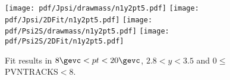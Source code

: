 \begin{figure}[H]
\begin{center}
\texttt{[image: pdf/Jpsi/drawmass/n1y2pt5.pdf]}
\texttt{[image: pdf/Jpsi/2DFit/n1y2pt5.pdf]}
\vspace*{-0.5cm}
\texttt{[image: pdf/Psi2S/drawmass/n1y2pt5.pdf]}
\texttt{[image: pdf/Psi2S/2DFit/n1y2pt5.pdf]}
\vspace*{-0.5cm}
\end{center}
\caption{Fit results in $8\gevc<pt<20\gevc$, $2.8<y<3.5$ and 0$\leq$PVNTRACKS$<$8.}
\label{Fitn1y2pt5}
\end{figure}
